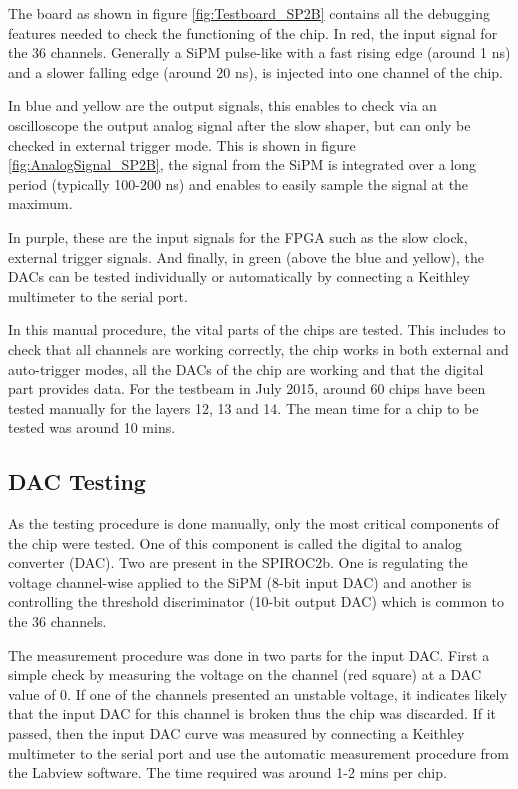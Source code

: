 The board as shown in figure \ref{fig:Testboard_SP2B} contains all the debugging features needed to check the functioning of the chip. In red, the input signal for the 36 channels. Generally a SiPM pulse-like with a fast rising edge (around 1 ns) and a slower falling edge (around 20 ns), is injected into one channel of the chip.

In blue and yellow are the output signals, this enables to check via an oscilloscope the output analog signal after the slow shaper, but can only be checked in external trigger mode. This is shown in figure \ref{fig:AnalogSignal_SP2B}, the signal from the SiPM is integrated over a long period (typically 100-200 ns) and enables to easily sample the signal at the maximum.

In purple, these are the input signals for the FPGA such as the slow clock, external trigger signals. And finally, in green (above the blue and yellow), the DACs can be tested individually or automatically by connecting a Keithley multimeter to the serial port.

In this manual procedure, the vital parts of the chips are tested. This includes to check that all channels are working correctly, the chip works in both external and auto-trigger modes, all the DACs of the chip are working and that the digital part provides data. For the testbeam in July 2015, around 60 chips have been tested manually for the layers 12, 13 and 14. The mean time for a chip to be tested was around 10 mins.

\subsection{DAC Testing}

As the testing procedure is done manually, only the most critical components of the chip were tested. One of this component is called the digital to analog converter (DAC). Two are present in the SPIROC2b. One is regulating the voltage channel-wise applied to the SiPM (8-bit input DAC) and another is controlling the threshold discriminator (10-bit output DAC) which is common to the 36 channels.

The measurement procedure was done in two parts for the input DAC. First a simple check by measuring the voltage on the channel (red square) at a DAC value of 0. If one of the channels presented an unstable voltage, it indicates likely that the input DAC for this channel is broken thus the chip was discarded. If it passed, then the input DAC curve was measured by connecting a Keithley multimeter to the serial port and use the automatic measurement procedure from the Labview software. The time required was around 1-2 mins per chip.

